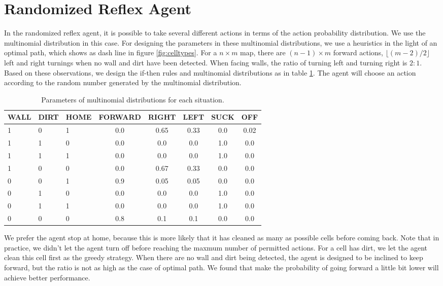 \section{Randomized Reflex Agent}
In the randomized reflex agent, it is possible to take several different actions in terms of the action probability distribution. We use the multinomial distribution in this case. For designing the parameters in these multinomial distributions, we use a heuristics in the light of an optimal path, which shows as dash line in figure \ref{fig:celltypes}. For a $n \times m$ map, there are $(n-1) \times m$ forward actions, $\lfloor (m-2)/2 \rfloor$ left and right turnings when no wall and dirt have
been detected. When facing walls, the ratio of turning left and turning right is $2:1$. Based on these observations, we design the if-then rules and multinomial distributions as in table \ref{tab:random}. The agent will choose an action according to the random number generated by the multinomial distribution.

\begin{table}[h]
    \centering
    \begin{tabular}{|l|l|l|c|c|c|c|c|}
        \hline
        WALL & DIRT & HOME & FORWARD & RIGHT & LEFT & SUCK & OFF  \\ \hline
        1    & 0    & 1    & 0.0     & 0.65  & 0.33 & 0.0  & 0.02 \\ 
        1    & 1    & 0    & 0.0     & 0.0   & 0.0  & 1.0  & 0.0  \\ 
        1    & 1    & 1    & 0.0     & 0.0   & 0.0  & 1.0  & 0.0  \\ 
        1    & 0    & 0    & 0.0     & 0.67  & 0.33 & 0.0  & 0.0  \\ 
        0    & 0    & 1    & 0.9     & 0.05  & 0.05 & 0.0  & 0.0  \\ 
        0    & 1    & 0    & 0.0     & 0.0   & 0.0  & 1.0  & 0.0  \\ 
        0    & 1    & 1    & 0.0     & 0.0   & 0.0  & 1.0  & 0.0  \\ 
        0    & 0    & 0    & 0.8     & 0.1   & 0.1  & 0.0  & 0.0  \\
        \hline
    \end{tabular}
    \caption{Parameters of multinomial distributions for each situation.}\label{tab:random}
\end{table}

We prefer the agent stop at home, because this is more likely that it has cleaned as many as possible cells before coming back. Note that in practice, we didn't let the agent turn off before reaching the maxmum number of permitted actions. For a cell has dirt, we let the agent clean this cell first as the greedy strategy. When there are no wall and dirt being detected, the agent is designed to be inclined to keep forward, but the ratio is not as high as the case of optimal path. We found
that make the probability of going forward a little bit lower will achieve better performance.
